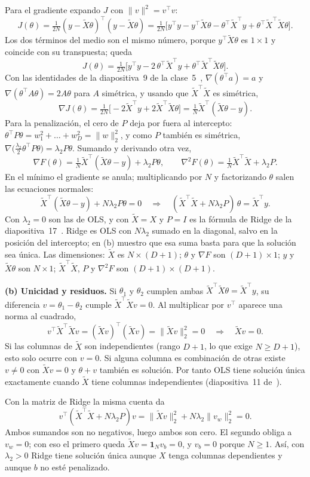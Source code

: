 \documentclass[10pt,a4paper]{article}
\newcommand{\Xt}{\tilde X}
\begin{document}
Para el gradiente expando $J$ con $\lVert v\rVert^2=v^\top v$:
\[ J(\theta)=\tfrac{1}{2N}(y-\Xt\theta)^\top(y-\Xt\theta)=\tfrac{1}{2N}\big[y^\top y-y^\top\Xt\theta-\theta^\top\Xt^\top y+\theta^\top\Xt^\top\Xt\theta\big]. \]
Los dos términos del medio son el mismo número, porque $y^\top\Xt\theta$ es $1\times1$ y coincide con su transpuesta; queda
\[ J(\theta)=\tfrac{1}{2N}\big[y^\top y-2\,\theta^\top\Xt^\top y+\theta^\top\Xt^\top\Xt\theta\big]. \]
Con las identidades de la diapositiva~9 de la clase~5~\cite{clase5}, $\nabla(\theta^\top a)=a$ y $\nabla(\theta^\top A\theta)=2A\theta$ para $A$ simétrica, y usando que $\Xt^\top\Xt$ es simétrica,
\[ \nabla J(\theta)=\tfrac{1}{2N}\big[-2\Xt^\top y+2\Xt^\top\Xt\theta\big]=\tfrac1N\Xt^\top(\Xt\theta-y). \]
Para la penalización, el cero de $P$ deja por fuera al intercepto: $\theta^\top P\theta=w_1^2+\dots+w_D^2=\lVert w\rVert_2^2$, y como $P$ también es simétrica, $\nabla\big(\frac{\lambda_2}{2}\theta^\top P\theta\big)=\lambda_2P\theta$. Sumando y derivando otra vez,
\[ \nabla F(\theta)=\tfrac1N\Xt^\top(\Xt\theta-y)+\lambda_2P\theta,\qquad \nabla^2F(\theta)=\tfrac1N\Xt^\top\Xt+\lambda_2P. \]
En el mínimo el gradiente se anula; multiplicando por $N$ y factorizando $\theta$ salen las ecuaciones normales:
\[ \Xt^\top(\Xt\theta-y)+N\lambda_2P\theta=0\quad\Longrightarrow\quad \boxed{(\Xt^\top\Xt+N\lambda_2P)\,\theta=\Xt^\top y}. \]
Con $\lambda_2=0$ son las de OLS, y con $\Xt=X$ y $P=I$ es la fórmula de Ridge de la diapositiva~17~\cite{clase5}. Ridge es OLS con $N\lambda_2$ sumado en la diagonal, salvo en la posición del intercepto; en (b) muestro que esa suma basta para que la solución sea única. Las dimensiones: $\Xt$ es $N\times(D+1)$; $\theta$ y $\nabla F$ son $(D+1)\times1$; $y$ y $\Xt\theta$ son $N\times1$; $\Xt^\top\Xt$, $P$ y $\nabla^2F$ son $(D+1)\times(D+1)$.

\textbf{(b) Unicidad y residuos.}
Si $\theta_1$ y $\theta_2$ cumplen ambas $\Xt^\top\Xt\theta=\Xt^\top y$, su diferencia $v=\theta_1-\theta_2$ cumple $\Xt^\top\Xt v=0$. Al multiplicar por $v^\top$ aparece una norma al cuadrado,
\[ v^\top\Xt^\top\Xt v=(\Xt v)^\top(\Xt v)=\lVert\Xt v\rVert_2^2=0\quad\Longrightarrow\quad \Xt v=0. \]
Si las columnas de $\Xt$ son independientes (rango $D+1$, lo que exige $N\ge D+1$), esto solo ocurre con $v=0$. Si alguna columna es combinación de otras existe $v\neq0$ con $\Xt v=0$ y $\theta+v$ también es solución. Por tanto OLS tiene solución única exactamente cuando $\Xt$ tiene columnas independientes (diapositiva~11 de~\cite{clase5}).

Con la matriz de Ridge la misma cuenta da
\[ v^\top(\Xt^\top\Xt+N\lambda_2P)v=\lVert\Xt v\rVert_2^2+N\lambda_2\lVert v_w\rVert_2^2=0 . \]
Ambos sumandos son no negativos, luego ambos son cero. El segundo obliga a $v_w=0$; con eso el primero queda $\Xt v=\bm 1_Nv_b=0$, y $v_b=0$ porque $N\ge1$. Así, con $\lambda_2>0$ Ridge tiene solución única aunque $X$ tenga columnas dependientes y aunque $b$ no esté penalizado.
\end{document}

